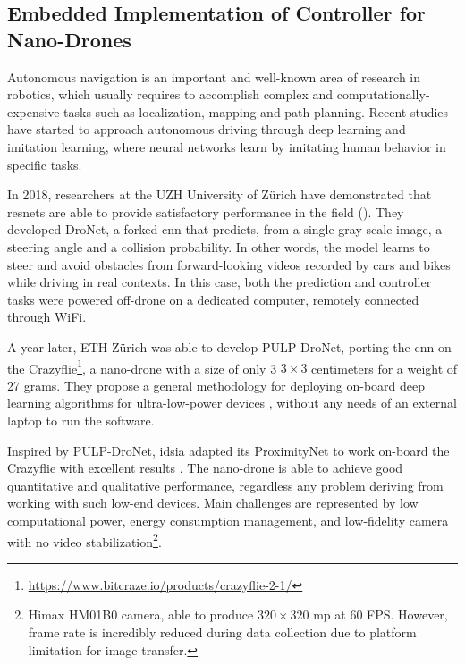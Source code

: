 \subsection{Embedded Implementation of Controller for Nano-Drones}
\label{subsec:sota-nicky}

Autonomous navigation is an important and well-known area of research in robotics, which usually requires to accomplish complex and computationally-expensive tasks such as localization, mapping and path planning. Recent studies have started to approach autonomous driving through deep learning and imitation learning\cite{imitation-learning}, where neural networks learn by imitating human behavior in specific tasks. 

\medskip

In 2018, researchers at the UZH University of Zürich have demonstrated that \gls{resnet}s are able to provide satisfactory performance in the field (\cite{Loquercio_2018}). They developed DroNet, a forked \gls{cnn} that predicts, from a single gray-scale image, a steering angle and a collision probability. In other words, the model learns to steer and avoid obstacles from forward-looking videos recorded by cars and bikes while driving in real contexts. In this case, both the prediction and controller tasks were powered off-drone on a dedicated computer, remotely connected through WiFi. 

A year later, ETH Zürich was able to develop PULP-DroNet, porting the \gls{cnn} on the Crazyflie\footnote{\url{https://www.bitcraze.io/products/crazyflie-2-1/}}, a nano-drone with a size of only 3 $3 \times 3$ centimeters for a weight of 27 grams. They propose a general methodology for deploying on-board deep learning algorithms for  ultra-low-power devices \cite{palossi2019pulpdronetIoTJ}, without any needs of an external laptop to run the software.

\medskip

Inspired by PULP-DroNet, \gls{idsia} adapted its ProximityNet to work on-board the Crazyflie with excellent results \cite{zimmerman2020thesis}. The nano-drone is able to achieve good quantitative and qualitative performance, regardless any problem deriving from working with such low-end devices. Main challenges are represented by low computational power, energy consumption management, and low-fidelity camera with no video stabilization\footnote{Himax HM01B0 camera, able to produce $320 \times 320$ \gls{mp} at 60 FPS. However, frame rate is incredibly reduced during data collection due to platform limitation for image transfer.}.




